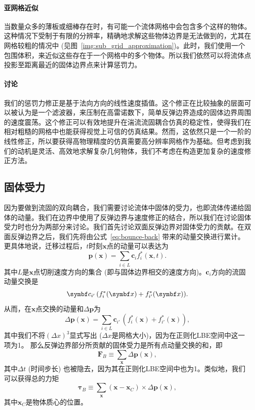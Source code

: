 \paragraph{亚网格近似}
当数量众多的薄板或细棒存在时，有可能一个流体网格中会包含多个这样的物体。这种情况下受制于有限的分辨率，精确地求解这些物体边界是无法做到的，尤其在网格较粗的情况中 (见图~\ref{img:sub_grid_approximation})。此时，我们使用一个包围体积，来近似这些存在于一个网格中的多个物体。所以我们依然可以将流体点投影至距离最近的固体边界点来计算惩罚力。

\paragraph{讨论}
我们的惩罚力修正是基于法向方向的线性速度插值。这个修正在比较抽象的层面可以被认为是一个滤波器，来压制在高雷诺数下，简单反弹边界造成的固体边界周围的速度震荡。这个修正可以有效地提升在湍流流固耦合仿真的稳定性，使得我们在相对粗糙的网格中也能获得视觉上可信的仿真结果。然而，这依然只是一个一阶的线性修正，所以要获得高物理精度的仿真需要高分辨率网格作为基础。但考虑到我们的动机是灵活、高效地求解复杂几何物体，我们不考虑在构造更加复杂的速度修正方法。

\subsection{固体受力}
因为要做到流固的双向耦合，我们需要讨论流体中固体的受力，也即流体传递给固体的动量。我们在边界中使用了反弹边界与速度修正的结合，所以我们在讨论固体受力时也分为两部分来讨论。我们首先讨论双面反弹边界对固体受力的贡献。在双面反弹边界之后，我们先将由公式~\ref{eq:bounce-back} 带来的动量交换进行累计。更具体地说，迁移过程后，$t$时刻$\bm{x}$点的动量可以表达为
\begin{equation}
  \bm{p}(\bm{x}) = \sum_{i \in L}\bm{c}_if^*_i(\bm{x},t).
\end{equation}
其中$L$是$\bm{x}$点切削速度方向的集合 (即与固体边界相交的速度方向)。$\bm{c}_i$方向的流固动量交换是
\begin{equation}
  \smash{\bm{c}_{i'}\,(f^*_{i}(\bm{x}) + f^*_{i'}(\bm{x}))}.
\end{equation}
从而，在$\bm{x}$点交换的动量和$\Delta \bm{p}$为
\begin{equation}
\Delta \bm{p}(\bm{x})= \sum_{i \in L} \bm{c}_{i'}\,(f^*_{i}(\bm{x}) + f^*_{i'}(\bm{x})),
\end{equation}
其中我们不将$(\Delta x)^3$显式写出 ($\Delta x$是网格大小)，因为在正则化LBE空间中这一项为1。
那么反弹边界部分所贡献的固体受力是所有点动量交换的和，即
\begin{equation}
\bm{F}_{B}\equiv \sum_{\bm{x}} \Delta \bm{p}(\bm{x}),
\end{equation}
其中$\Delta t$ (时间步长) 也被隐去，因为其在正则化LBE空间中也为1。类似地，我们可以获得总的力矩
\begin{equation}
\bm{\tau}_{B}\equiv \sum_{\bm{x}} (\bm{x}-\bm{x}_{C})\times\Delta \bm{p}(\bm{x}),
\end{equation}
其中$\bm{x}_{C}$是物体质心的位置。

